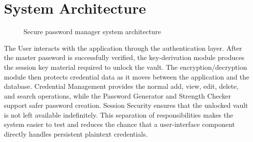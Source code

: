 \documentclass[12pt,a4paper,oneside]{report}
\begin{document}
\section{System Architecture}
\begin{figure}[H]
\centering
{}
\caption{Secure password manager system architecture}
\label{fig:architecture}
\end{figure}
The User interacts with the application through the authentication layer. After the master password is successfully verified, the key-derivation module produces the session key material required to unlock the vault. The encryption/decryption module then protects credential data as it moves between the application and the database. Credential Management provides the normal add, view, edit, delete, and search operations, while the Password Generator and Strength Checker support safer password creation. Session Security ensures that the unlocked vault is not left available indefinitely. This separation of responsibilities makes the system easier to test and reduces the chance that a user-interface component directly handles persistent plaintext credentials.
\end{document}
